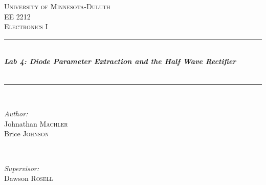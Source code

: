 \documentclass[10pt,a4paper]{article}
\begin{document}
\begin{titlepage}
\newcommand{\HRule}{\rule{\linewidth}{0.5mm}} %
\center %
\textsc{\LARGE University of Minnesota-Duluth}\\[1.5cm] %
\textsc{\Large EE 2212}\\[0.5cm] %
\textsc{\large Electronics I}\\[0.5cm] %
\HRule \\[0.4cm]
{ \huge \bfseries \emph{{\color{black}Lab 4: Diode Parameter Extraction and the Half Wave Rectifier }}}\\[0.4cm] %
{\color{black}{\large \today}}\\
\HRule \\[1cm]


\begin{minipage}{0.4\textwidth}
\begin{flushleft} \large
\emph{Author:}\\
Johnathan \textsc{Machler}\\
Brice  \textsc{Johnson }
\end{flushleft}
\end{minipage}
~
\begin{minipage}{0.4\textwidth}
\begin{flushright} \large
\emph{Supervisor:} \\
Dawson \textsc{Rosell} %
\end{flushright}


\end{minipage}\\[1cm] %


\end{titlepage}
\end{document}
